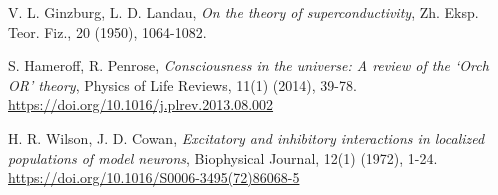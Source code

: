 \documentclass[12pt, reqno]{amsart}
\theoremstyle{definition}
\theoremstyle{remark}
\numberwithin{equation}{section}
\begin{document}

\begin{thebibliography}{99}

 V. L. Ginzburg, L. D. Landau, \textit{On the theory of superconductivity}, Zh. Eksp. Teor. Fiz., 20 (1950), 1064-1082.

 S. Hameroff, R. Penrose, \textit{Consciousness in the universe: A review of the ‘Orch OR’ theory}, Physics of Life Reviews, 11(1) (2014), 39-78.
\url{https://doi.org/10.1016/j.plrev.2013.08.002}

 H. R. Wilson, J. D. Cowan, \textit{Excitatory and inhibitory interactions in localized populations of model neurons}, Biophysical Journal, 12(1) (1972), 1-24.
\url{https://doi.org/10.1016/S0006-3495(72)86068-5}

\end{thebibliography}
\end{document}
